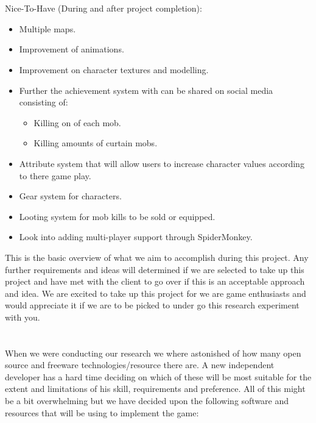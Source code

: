 \documentclass[letterpaper]{article}
\begin{document}
			\\
			\\
			Nice-To-Have (During and after project completion): \\
			\begin{itemize}
				\item Multiple maps.
				\item Improvement of animations.
				\item Improvement on character textures and modelling.
				\item Further the achievement system with can be shared on social media consisting of:
					\begin{itemize}
						\item Killing on of each mob.
						\item Killing amounts of curtain mobs.
					\end{itemize}
				\item Attribute system that will allow users to increase character values according to there game play.
				\item Gear system for characters.
				\item Looting system for mob kills to be sold or equipped.
				\item Look into adding multi-player support through SpiderMonkey.
			\end{itemize}
			
			\vspace{0.1in}
			\noindent This is the basic overview of what we aim to accomplish during this project. Any further requirements and ideas will determined if we are selected to take up this project and have met with the client to go over if this is an acceptable approach and idea. We are excited to take up this project for we are game enthusiasts and would appreciate it if we are to be picked to under go this research experiment with you.
		
		\vspace{0.2in}
		
		\section*{\colorbox{blue}{}} 
		
		\vspace{0.2in}
		
		When we were conducting our research we where astonished of how many open source and freeware technologies/resource there are. A new independent developer has a hard time deciding on which of these will be most suitable for the extent and limitations of his skill, requirements and preference. All of this might be a bit overwhelming but we have decided upon the following software and resources that will be using to implement the game:
		
\end{document}
